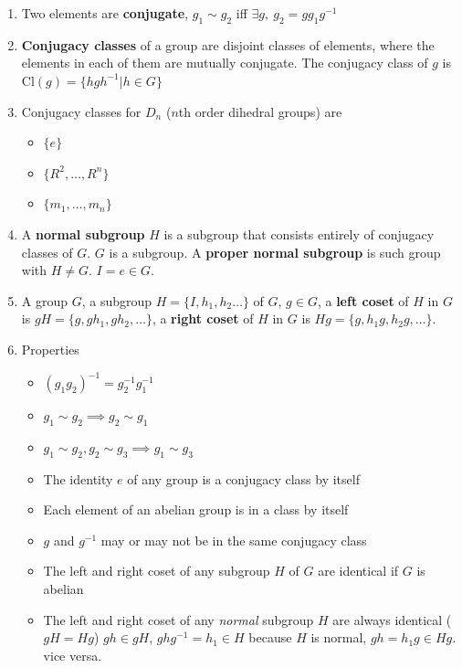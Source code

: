 \documentclass{article}
\theoremstyle{remark}
\theoremstyle{remark}
\begin{document}
\begin{enumerate}
        \item Two elements are \textbf{conjugate}, $g_1\sim g_2$ iff $\exists g,\ g_2=gg_1g^{-1}$
        \item \textbf{Conjugacy classes} of a group are disjoint classes of elements, where the elements in each of them are mutually conjugate. The conjugacy class of $g$ is $\mathrm{Cl}(g)=\{hgh^{-1}|h\in G\}$
        \item Conjugacy classes for $D_n$ ($n$th order dihedral groups) are \begin{itemize}
                \item $\{e\}$
                \item $\{R^2,\ldots,R^n\}$
                \item $\{m_1,\ldots,m_n\}$
            \end{itemize}
        \item A \textbf{normal subgroup} $H$ is a subgroup that consists entirely of conjugacy classes of $G$. $G$ is a subgroup. A \textbf{proper normal subgroup} is such group with $H\neq G$. $I=e\in G$.
        \item A group $G$, a subgroup $H=\{I,h_1,h_2\ldots\}$ of $G$, $g\in G$, a \textbf{left coset} of $H$ in $G$ is $gH=\{g,gh_1,gh_2,\ldots\}$, a \textbf{right coset} of $H$ in $G$ is $Hg=\{g,h_1 g,h_2 g,\ldots\}$.
        \item Properties\begin{itemize}
                \item $(g_1g_2)^{-1}=g_2^{-1}g_1^{-1}$
                \item $g_1\sim g_2\implies g_2\sim g_1$
                \item $g_1\sim g_2, g_2\sim g_3\implies g_1\sim g_3$
                \item The identity $e$ of any group is a conjugacy class by itself
                \item Each element of an abelian group is in a class by itself
                \item $g$ and $g^{-1}$ may or may not be in the same conjugacy class
                \item The left and right coset of any subgroup $H$ of $G$ are identical if $G$ is abelian
                \item The left and right coset of any \emph{normal} subgroup $H$ are always identical ($gH=Hg$)\newline
                        $gh\in gH$, $ghg^{-1}=h_1\in H$ because $H$ is normal, $gh=h_1 g\in Hg$. vice versa.

\end{itemize}
\end{enumerate}
\end{document}
